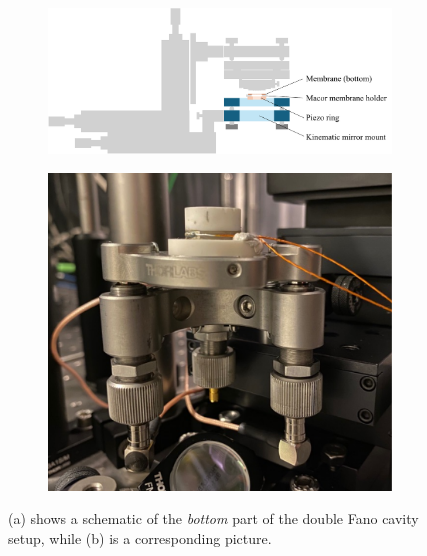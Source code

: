 \begin{figure}[h!]
    \centering
    \begin{subfigure}[b]{0.6\textwidth}
        \includegraphics[width=\textwidth]{figures/setup_bottom.pdf}
        \caption{}
        \label{fig:setup_bottom}
    \end{subfigure}
    \begin{subfigure}[b]{0.3\textwidth}
        \includegraphics[width=\textwidth]{figures/cavity_setup_bottom_pic.pdf}
        \caption{}
        \label{fig:setup_bottom_pic}
    \end{subfigure}
    \caption{(a) shows a schematic of the \emph{bottom} part of the double Fano cavity setup, while (b) is a corresponding picture.}
    \label{fig:setup_bottom_sketch_and_pic}
\end{figure}

